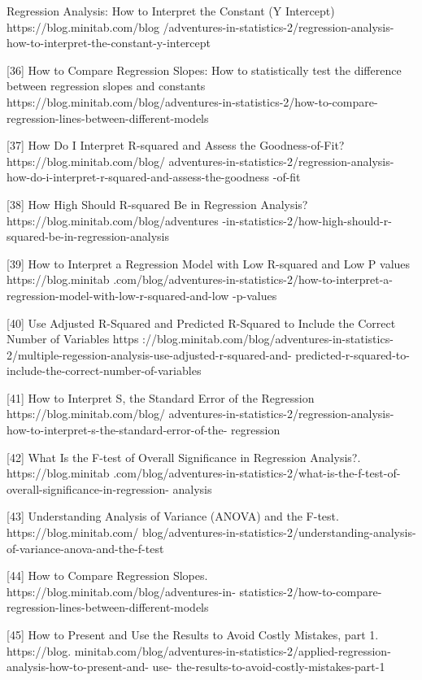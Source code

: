 \begin{flushleft}
[35]	Regression Analysis: How to Interpret the Constant (Y Intercept) https://blog.minitab.com/blog
/adventures-in-statistics-2/regression-analysis-how-to-interpret-the-constant-y-intercept

[36]	How to Compare Regression Slopes: How to statistically test the difference between regression 
slopes and constants https://blog.minitab.com/blog/adventures-in-statistics-2/how-to-compare-
regression-lines-between-different-models

[37]	How Do I Interpret R-squared and Assess the Goodness-of-Fit? https://blog.minitab.com/blog/
adventures-in-statistics-2/regression-analysis-how-do-i-interpret-r-squared-and-assess-the-goodness
-of-fit

[38]	How High Should R-squared Be in Regression Analysis? https://blog.minitab.com/blog/adventures
-in-statistics-2/how-high-should-r-squared-be-in-regression-analysis

[39]	How to Interpret a Regression Model with Low R-squared and Low P values https://blog.minitab
.com/blog/adventures-in-statistics-2/how-to-interpret-a-regression-model-with-low-r-squared-and-low
-p-values

[40]	Use Adjusted R-Squared and Predicted R-Squared to Include the Correct Number of Variables https
://blog.minitab.com/blog/adventures-in-statistics-2/multiple-regession-analysis-use-adjusted-r-squared-and-
predicted-r-squared-to-include-the-correct-number-of-variables

[41]	How to Interpret S, the Standard Error of the Regression https://blog.minitab.com/blog/
adventures-in-statistics-2/regression-analysis-how-to-interpret-s-the-standard-error-of-the-
regression

[42]	What Is the F-test of Overall Significance in Regression Analysis?. https://blog.minitab
.com/blog/adventures-in-statistics-2/what-is-the-f-test-of-overall-significance-in-regression-
analysis

[43]	Understanding Analysis of Variance (ANOVA) and the F-test. https://blog.minitab.com/
blog/adventures-in-statistics-2/understanding-analysis-of-variance-anova-and-the-f-test

[44]	How to Compare Regression Slopes. https://blog.minitab.com/blog/adventures-in-
statistics-2/how-to-compare-regression-lines-between-different-models

[45]	How to Present and Use the Results to Avoid Costly Mistakes, part 1. https://blog.
minitab.com/blog/adventures-in-statistics-2/applied-regression-analysis-how-to-present-and-
use- the-results-to-avoid-costly-mistakes-part-1


\end{flushleft}
